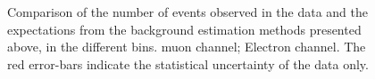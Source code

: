 


\begin{figure}[htb]
\centering
{}\quad
{}\quad
\caption[]{Comparison of the number of events observed in the data and the
  expectations from the background estimation methods presented above, in the
  different \STlep bins. muon channel;
   Electron channel.  The red error-bars indicate the
  statistical uncertainty of the data only.}
\label{fig:susy_pred}
\end{figure}